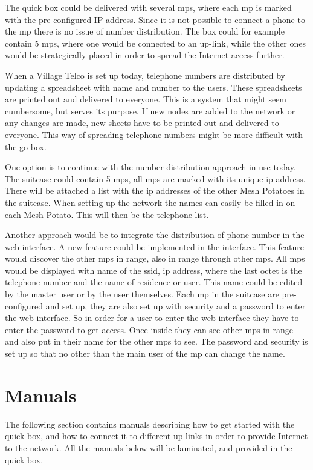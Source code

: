The \gls{quick} box could be delivered with several \glspl{mp}, where each \gls{mp} is marked with the pre-configured IP address. Since it is not possible to connect a phone to the \gls{mp} there is no issue of number distribution. The box could for example contain 5 \glspl{mp}, where one would be connected to an up-link, while the other ones would be strategically placed in order to spread the Internet access further. 

When a Village Telco is set up today, telephone numbers are distributed by updating a spreadsheet with name and number to the users. These spreadsheets are printed out and delivered to everyone. This is a system that might seem cumbersome, but serves its purpose. If new nodes are added to the network or any changes are made, new sheets have to be printed out and delivered to everyone. This way of spreading telephone numbers might be more difficult with the go-box. 

One option is to continue with the number distribution approach in use today. The suitcase could contain 5 \glspl{mp}, all \glspl{mp} are marked with its unique \gls{ip} address. There will be attached a list with the \gls{ip} addresses of the other Mesh Potatoes in the suitcase. When setting up the network the names can easily be filled in on each Mesh Potato. This will then be the telephone list.  

Another approach would be to integrate the distribution of phone number in the web interface. A new feature could be implemented in the interface. This feature would discover the other \glspl{mp} in range, also in range through other \glspl{mp}. All \glspl{mp} would be displayed with name of the \gls{ssid}, \gls{ip} address, where the last octet is the telephone number and the name of residence or user. This name could be edited by the master user or by the user themselves. Each \gls{mp} in the suitcase are pre-configured and set up, they are also set up with security and a password to enter the web interface. So in order for a user to enter the web interface they have to enter the password to get access. Once inside they can see other \glspl{mp} in range and also put in their name for the other \glspl{mp} to see. The password and security is set up so that no other than the main user of the \gls{mp} can change the name. 

\section{Manuals}
The following section contains manuals describing how to get started with the \gls{quick} box, and how to connect it to different up-links in order to provide Internet to the network. All the manuals below will be laminated, and provided in the \gls{quick} box. 

